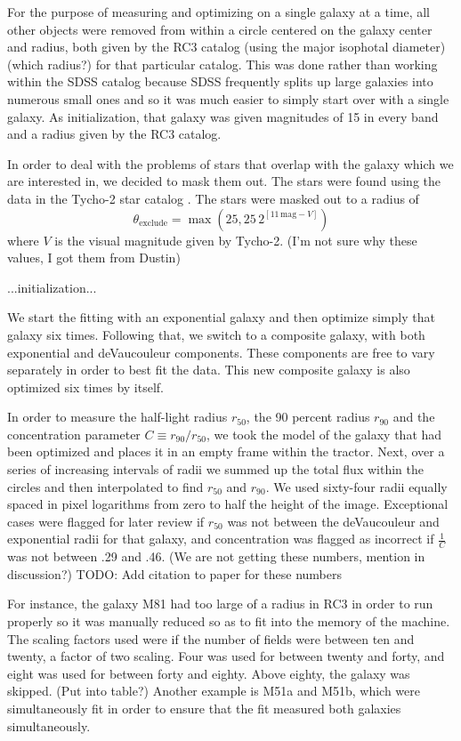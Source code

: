 \documentclass[12pt,preprint,pdftex]{aastex}
\newcommand{\units}[1]{\mathrm{#1}}
\renewcommand{\mag}{\units{mag}}
\newcommand{\rfifty}{r_{50}}
\newcommand{\rninety}{r_{90}}
\newcommand{\conc}{C}
\begin{document}
For the purpose of measuring and optimizing on a single galaxy at a
time, all other objects were removed from within a circle centered on
the galaxy center and radius, both given by the RC3 catalog (using the major isophotal diameter)
(which radius?) for that particular catalog. This was done rather than
working within the SDSS catalog because SDSS frequently splits up large
galaxies into numerous small ones and so it was much easier to simply
start over with a single galaxy. As initialization, that galaxy was
given magnitudes of 15 in every band and a radius given by the RC3
catalog.

In order to deal with the problems of stars that overlap with the
galaxy which we are interested in, we decided to mask them out. The
stars were found using the data in the Tycho-2 star catalog \citep{tycho2}.
The stars were masked out to a
radius of
\begin{equation}
\theta_{\mathrm{exclude}} = \max(25, 25\,2^{[11\,\mag-V]})
\end{equation}
where $V$ is the visual magnitude given by Tycho-2.
(I'm not sure why these values, I got them from Dustin)

...initialization...

We start the fitting with an exponential galaxy and then optimize
simply that galaxy six times. Following that, we switch to a composite
galaxy, with both exponential and deVaucouleur components. These
components are free to vary separately in order to best fit the
data. This new composite galaxy is also optimized six times by itself.

In order to measure the half-light radius $\rfifty$, the 90 percent
radius $\rninety$ and the concentration parameter $\conc\equiv
\rninety/\rfifty$, we took the model of the galaxy that had been
optimized and places it in an empty frame within the tractor. Next,
over a series of increasing intervals of radii we summed up the total
flux within the circles and then interpolated to find $\rfifty$ and $\rninety$.
 We used sixty-four radii equally spaced in pixel logarithms from zero
 to half the height of the image. Exceptional cases were flagged for later
 review if $\rfifty$ was not between the deVaucouleur and exponential radii
 for that galaxy, and concentration was flagged as incorrect if $\frac{1}{\conc}$
 was not between .29 and .46. (We are not getting these numbers, mention in
 discussion?) TODO: Add citation to paper for these numbers

For instance, the galaxy M81 had too large of a radius in RC3 in order to run properly so it was manually reduced so as to fit into the memory of the machine. The scaling factors used were if the number of fields were between ten and twenty, a factor of two scaling. Four was used for between twenty and forty, and eight was used for between forty and eighty. Above eighty, the galaxy was skipped. (Put into table?) Another example is M51a and M51b, which were simultaneously fit in order to ensure that the fit measured both galaxies simultaneously. 
\end{document}
